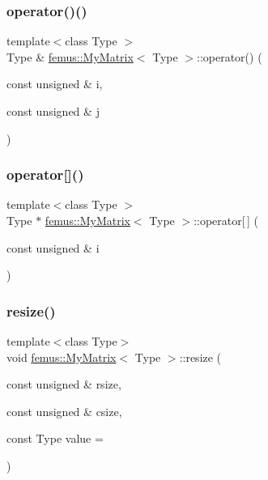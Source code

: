 \mbox{\label{classfemus_1_1_my_matrix_a84957a60650870f940878415c93ade3c}} 
\subsubsection{\texorpdfstring{operator()()}{operator()()}}
{\footnotesize\ttfamily template$<$class Type $>$ \\
Type \& \mbox{\hyperlink{classfemus_1_1_my_matrix}{femus\+::\+My\+Matrix}}$<$ Type $>$\+::operator() (\begin{DoxyParamCaption}\item[{const unsigned \&}]{i,  }\item[{const unsigned \&}]{j }\end{DoxyParamCaption})}

\mbox{\label{classfemus_1_1_my_matrix_a014bbebfebe4b35d96766b69778f0e82}} 
\subsubsection{\texorpdfstring{operator[]()}{operator[]()}}
{\footnotesize\ttfamily template$<$class Type $>$ \\
Type $\ast$ \mbox{\hyperlink{classfemus_1_1_my_matrix}{femus\+::\+My\+Matrix}}$<$ Type $>$\+::operator\mbox{[}$\,$\mbox{]} (\begin{DoxyParamCaption}\item[{const unsigned \&}]{i }\end{DoxyParamCaption})}

\mbox{\label{classfemus_1_1_my_matrix_af6eccdb4db1869148cc7fe22590c2625}} 
\subsubsection{\texorpdfstring{resize()}{resize()}\hspace{0.1cm}{\footnotesize\ttfamily [1/2]}}
{\footnotesize\ttfamily template$<$class Type$>$ \\
void \mbox{\hyperlink{classfemus_1_1_my_matrix}{femus\+::\+My\+Matrix}}$<$ Type $>$\+::resize (\begin{DoxyParamCaption}\item[{const unsigned \&}]{rsize,  }\item[{const unsigned \&}]{csize,  }\item[{const Type}]{value = {} }\end{DoxyParamCaption})}

